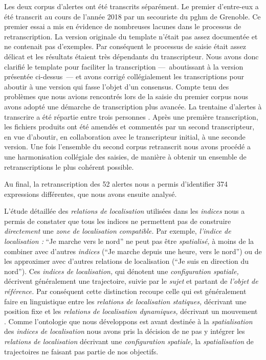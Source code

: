 Les deux corpus d'alertes ont été transcrits séparément. Le premier
d'entre-eux a été transcrit au cours de l'année 2018 par un secouriste
du \ac{pghm} de Grenoble. Ce premier essai a mis en évidence de
nombreuses lacunes dans le processus de retranscription. La version
originale du template n'était pas assez documentée et ne contenait pas
d'exemples. Par conséquent le processus de saisie était assez délicat
et les résultats étaient très dépendants du transcripteur. Nous avons
donc clarifié le template pour faciliter la transcription
---~aboutissant à la version présentée ci-dessus~--- et avons corrigé
collégialement les transcriptions pour aboutir à une version qui fasse
l'objet d'un consensus. Compte tenu des problèmes que nous avions
rencontrés lors de la saisie du premier corpus nous avons adopté une
démarche de transcription plus avancée. La trentaine d'alertes à
transcrire a été répartie entre trois personnes
\autocite{Bunel2019}. Après une première transcription, les fichiers
produits ont été amendés et commentés par un second transcripteur, en
vue d'aboutir, en collaboration avec le transcripteur initial, à une
seconde version. Une fois l'ensemble du second corpus retranscrit nous
avons procédé a une harmonisation collégiale des saisies, de manière à
obtenir un ensemble de retranscriptions le plus cohérent possible.

Au final, la retranscription des 52 alertes nous a permis d'identifier
374 expressions différentes, que nous avons ensuite analysé.

L'étude détaillée des \emph{relations de localisation} utilisées dans
les \emph{indices} nous a permis de constater que tous les indices ne
permettent pas de construire \emph{directement} une \emph{zone de
  localisation compatible.} Par exemple, \emph{l'indice de
  localisation :} \enquote{Je marche vers le nord} ne peut pas être
\emph{spatialisé,} à moins de la combiner avec d'autres \emph{indices}
(\eg \enquote{Je marche depuis une heure, vers le nord}) ou de les
approximer avec d'autres relations de localisation (\eg \enquote{Je
  suis en direction du nord}). Ces \emph{indices de localisation,} qui
dénotent une \emph{configuration spatiale,} décrivent généralement une
trajectoire, suivie par le \emph{sujet} et partant de \emph{l'objet de
  référence.} Par conséquent cette distinction recoupe celle qui est
généralement faire en linguistique entre les \emph{relations de
  localisation statiques,} décrivant une position fixe et les
\emph{relations de localisation dynamiques,} décrivant un mouvement
\autocite{Borillo1998}. Comme l'ontologie que nous développons est
avant destinée à la \emph{spatialisation} des \emph{indices de
  localisation} nous avons pris la décision de ne pas y intégrer les
\emph{relations de localisation} décrivant une \emph{configuration
  spatiale,} la \emph{spatialisation} de trajectoires ne faisant pas
partie de nos objectifs.


